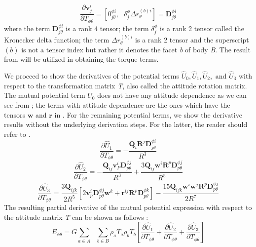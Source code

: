 \begin{equation}
\label{v_diff_T}
\frac{\partial \mathbf{v}_j^i}{\partial T_{\phi \theta}} = [0_{j \theta}^{\phi i}, \text{ } \delta_j^\phi \Delta r_\theta^{(b)i}] = \mathbf{D}_{j\theta}^{\phi i}
\end{equation}
%
where the term $\mathbf{D}_{j \theta}^{\phi i}$ is a rank 4 tensor; the term $\delta_j^\phi$ is a rank 2 tensor called the Kronecker delta function; the term $\Delta r_\theta^{(b)i}$ is a rank 2 tensor and the superscript $(b)$ is not a tensor index but rather it denotes the facet \textit{b} of body \textit{B}. The result from  will be utilized in obtaining the torque terms.

We proceed to show the derivatives of the potential terms $\hat{U}_0, \hat{U}_1, \hat{U}_2, \text{ and } \hat{U}_3$ with respect to the transformation matrix \textit{T}, also called the attitude rotation matrix. The mutual potential term $\hat{U}_0$ does not have any attitude dependence as we can see from ; the terms with attitude dependence are the ones which have the tensors $\mathbf{w}$ and $\mathbf{r}$ in . For the remaining potential terms, we show the derivative results without the underlying derivation steps. For the latter, the reader should refer to \cite{fahn_poly}.
\begin{equation}
\label{u1_diff_T}
\frac{\partial \hat{U}_1}{\partial T_{\phi \theta}} = -\frac{\mathbf{Q}_i \mathbf{R}^j \mathbf{D}_{j \theta}^{\phi i}}{R^3}
\end{equation}
%
\begin{equation}
\label{u2_diff_T}
\frac{\partial \hat{U}_2}{\partial T_{\phi \theta}} = -\frac{\mathbf{Q}_{ij} \mathbf{v}_P^i \mathbf{D}_{p\theta}^{\phi j}}{R^3} + \frac{3\mathbf{Q}_{ij} \mathbf{w}^i \mathbf{R}^p \mathbf{D}_{p\theta}^{\phi j}}{R^5}
\end{equation}
%
\begin{equation}
\label{u3_diff_T}
\frac{\partial \hat{U}_3}{\partial T_{\phi \theta}} = \frac{3 \mathbf{Q}_{ijk}}{2R^5} \left[2\mathbf{v}_p^i \mathbf{D}_{p\theta}^{\phi j} \mathbf{w}^k + \mathbf{r}^{ij} \mathbf{R}^p \mathbf{D}_{p\theta}^{\phi k} \right] - \frac{15 \mathbf{Q}_{ijk} \mathbf{w}^i \mathbf{w}^j \mathbf{R}^p \mathbf{D}_{p\theta}^{\phi j}}{2R^7}
\end{equation}
%
The resulting partial derivative of the mutual potential expression with respect to the attitude matrix \textit{T} can be shown as follows \cite{fahn_poly}:
\begin{equation}
\label{u_diff_T}
E_{\phi \theta} = G \sum_{a \in A} \text{ } \sum_{b \in B} \rho_a T_a \rho_b T_b \left[\frac{\partial \hat{U}_1}{\partial T_{\phi \theta}} + \frac{\partial \hat{U}_2}{\partial T_{\phi \theta}} + \frac{\partial \hat{U}_3}{\partial T_{\phi \theta}} \right]
\end{equation}
